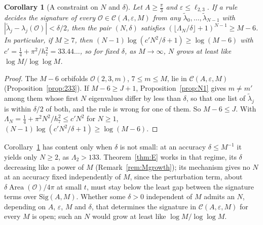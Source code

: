 \documentclass[pdflatex,sn-mathphys-num]{sn-jnl}
\theoremstyle{thmstyleone}%
\newtheorem{corollary}[theorem]{Corollary}%
\theoremstyle{thmstylethree}%
\newcommand{\Orb}{\mathcal{O}}
\newcommand{\Cl}{\mathcal{C}}
\newcommand{\Sig}{\mathrm{Sig}}
\newcommand{\Area}{\operatorname{Area}}
\begin{document}
\begin{corollary}[A constraint on $N$ and $\delta$]\label{cor:Nlower}
Let $A\ge\frac\pi3$ and $\varepsilon\le\ell_{2,3}$. If a rule decides the signature of every $\Orb\in\Cl(A,\varepsilon,M)$ from any $\tilde\lambda_0,\dots,\tilde\lambda_{N-1}$ with $|\tilde\lambda_j-\lambda_j(\Orb)|<\delta/2$, then the pair $(N,\delta)$ satisfies $(\lfloor\Lambda_N/\delta\rfloor+1)^{N-1}\ge M-6$. In particular, if $M\ge7$, then $(N-1)\log(c'N^2/\delta+1)\ge\log(M-6)$ with $c'=\frac14+\pi^2/h_7^2=33.44\ldots$, so for fixed $\delta$, as $M\to\infty$, $N$ grows at least like $\log M/\log\log M$.
\end{corollary}

\begin{proof}
The $M-6$ orbifolds $\Orb(2,3,m)$, $7\le m\le M$, lie in $\Cl(A,\varepsilon,M)$ (Proposition~\ref{prop:233}). If $M-6\ge J+1$, Proposition~\ref{prop:N1} gives $m\ne m'$ among them whose first $N$ eigenvalues differ by less than $\delta$, so that one list of $\tilde\lambda_j$ is within $\delta/2$ of both, and the rule is wrong for one of them. So $M-6\le J$. With $\Lambda_N=\frac14+\pi^2N^2/h_7^2\le c'N^2$ for $N\ge1$, $(N-1)\log(c'N^2/\delta+1)\ge\log(M-6)$.
\end{proof}

Corollary~\ref{cor:Nlower} has content only when $\delta$ is not small: at an accuracy $\delta\le M^{-1}$ it yields only $N\ge2$, as $\Lambda_2>133$. Theorem~\ref{thm:E} works in that regime, its $\delta$ decreasing like a power of $M$ (Remark~\ref{rem:Mgrowth}); its mechanism gives no $N$ at an accuracy fixed independently of $M$, since the perturbation term, about $\delta\Area(\Orb)/4\pi$ at small $t$, must stay below the least gap between the signature terms over $\Sig(A,M)$. Whether some $\delta>0$ independent of $M$ admits an $N$, depending on $A$, $\varepsilon$, $M$ and $\delta$, that determines the signature in $\Cl(A,\varepsilon,M)$ for every $M$ is open; such an $N$ would grow at least like $\log M/\log\log M$.
\end{document}
